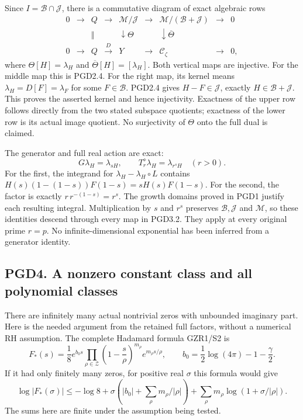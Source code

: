 Since \(I=\mathcal B\cap\mathcal J\), there is a commutative diagram of
exact algebraic rows \[
\begin{array}{ccccccccc}
0&\longrightarrow&Q&\longrightarrow&\mathcal M/\mathcal J
&\longrightarrow&\mathcal M/(\mathcal B+\mathcal J)&\longrightarrow&0\\
&&\Vert&&\downarrow\Theta&&\downarrow\overline\Theta&&\\
0&\longrightarrow&Q&\xrightarrow{D}&Y
&\longrightarrow&\mathcal C_\zeta&\longrightarrow&0,
\end{array}
\tag{PGD3.2}
\] where \(\Theta[H]=\lambda_H\) and \(\overline\Theta[H]=[\lambda_H]\).
Both vertical maps are injective. For the middle map this is PGD2.4. For
the right map, its kernel means \(\lambda_H=D[F]=\lambda_F\) for some
\(F\in\mathcal B\). PGD2.4 gives \(H-F\in\mathcal J\), exactly
\(H\in\mathcal B+\mathcal J\). This proves the asserted kernel and hence
injectivity. Exactness of the upper row follows directly from the two
stated subspace quotients; exactness of the lower row is its actual
image quotient. No surjectivity of \(\Theta\) onto the full dual is
claimed.

The generator and full real action are exact: \[
G\lambda_H=\lambda_{sH},\qquad
T_r^\diamond\lambda_H=\lambda_{r^sH}\quad(r>0).
\tag{PGD3.3}
\] For the first, the integrand for \(\lambda_H-\lambda_H\circ L\)
contains \(H(s)(1-(1-s))F(1-s)=sH(s)F(1-s)\). For the second, the factor
is exactly \(r\,r^{-(1-s)}=r^s\). The growth domains proved in PGD1
justify each resulting integral. Multiplication by \(s\) and \(r^s\)
preserves \(\mathcal B,\mathcal J\) and \(\mathcal M\), so these
identities descend through every map in PGD3.2. They apply at every
original prime \(r=p\). No infinite-dimensional exponential has been
inferred from a generator identity.

\subsection{PGD4. A nonzero constant class and all polynomial
classes}\label{pgd4.-a-nonzero-constant-class-and-all-polynomial-classes}

There are infinitely many actual nontrivial zeros with unbounded
imaginary part. Here is the needed argument from the retained full
factors, without a numerical RH assumption. The complete Hadamard
formula GZR1/S2 is \[
F_*(s)=\frac18 e^{b_0s}
\prod_{\rho\in\mathscr Z}\left(1-\frac{s}{\rho}\right)^{m_\rho}
e^{m_\rho s/\rho},\qquad
b_0=\frac12\log(4\pi)-1-\frac\gamma2.
\tag{PGD4.1}
\] If it had only finitely many zeros, for positive real \(\sigma\) this
formula would give \[
\log|F_*(\sigma)|\le-\log8+
\sigma\left(|b_0|+\sum_\rho m_\rho/|\rho|\right)
+\sum_\rho m_\rho\log(1+\sigma/|\rho|).
\tag{PGD4.2}
\] The sums here are finite under the assumption being tested.

